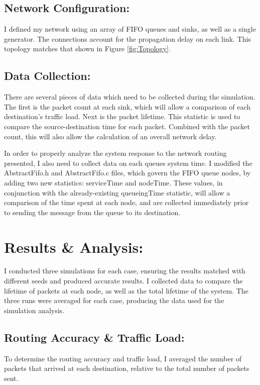 \documentclass{article}
\begin{document}
\subsection{Network Configuration:}  
\label{subsec:Config}
I defined my network using an array of FIFO queues and sinks, as well as a single generator.
The connections account for the propagation delay on each link.
This topology matches that shown in Figure \ref{fig:Topology}.


\subsection{Data Collection:}
\label{subsec:DataCollection}
There are several pieces of data which need to be collected during the simulation.
The first is the packet count at each sink, which will allow a comparison of each destination's traffic load.
Next is the packet lifetime.  
This statistic is used to compare the source-destination time for each packet.
Combined with the packet count, this will also allow the calculation of an overall network delay.

In order to properly analyze the system response to the network routing presented, I also need to collect data on each queues system time.
I modified the AbstractFifo.h and AbstractFifo.c files, which govern the FIFO queue nodes, by adding two new statistics:  serviceTime and nodeTime.
These values, in conjunction with the already-existing queueingTime statistic, will allow a comparison of the time spent at each node, and are collected immediately prior to sending the message from the queue to its destination.

\newpage
\section{Results \& Analysis:}
\label{sec:Results}
I conducted three simulations for each case, ensuring the results matched with different seeds and produced accurate results.
I collected data to compare the lifetime of packets at each node, as well as the total lifetime of the system.
The three runs were averaged for each case, producing the data used for the simulation analysis.

\subsection{Routing Accuracy \& Traffic Load:}
\label{subsec:RoutingResults}
To determine the routing accuracy and traffic load, I averaged the number of packets that arrived at each destination, relative to the total number of packets sent.
\end{document}
